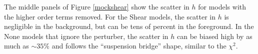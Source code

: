 The middle panels of Figure \ref{mockshear} show the scatter in $h$ for models with the higher order terms removed. For the Shear models, the scatter in $h$ is negligible in the background, but can be tens of percent in the foreground. In the None models that ignore the perturber, the scatter in $h$ can be biased high by as much as $\sim 35\%$ and follows the ``suspension bridge'' shape, similar to the $\chi^2$.